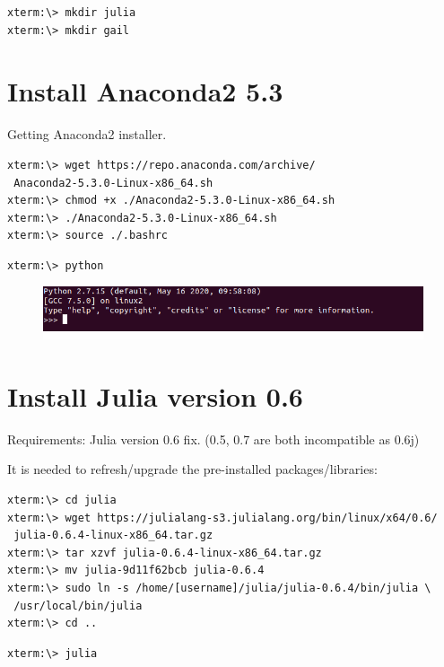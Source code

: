 \documentclass[openany,11pt]{report}%
\begin{document}
\begin{lstlisting}[style=DOS]
xterm:\> mkdir julia
xterm:\> mkdir gail
\end{lstlisting}


\section{Install Anaconda2 5.3}

Getting Anaconda2 installer.

\begin{lstlisting}[style=DOS]
xterm:\> wget https://repo.anaconda.com/archive/
 Anaconda2-5.3.0-Linux-x86_64.sh
xterm:\> chmod +x ./Anaconda2-5.3.0-Linux-x86_64.sh
xterm:\> ./Anaconda2-5.3.0-Linux-x86_64.sh
xterm:\> source ./.bashrc
\end{lstlisting}


\begin{lstlisting}[style=DOS]
xterm:\> python
\end{lstlisting}

\begin{figure}[h]
    \centering
    \includegraphics[width=\textwidth]{img/python.png}
    \label{fig: python versin}
\end{figure}

\section{Install Julia version 0.6}
Requirements: Julia version 0.6 fix.  (0.5, 0.7 are both incompatible as 0.6j)

It is needed to refresh/upgrade the pre-installed packages/libraries:
\begin{lstlisting}[style=DOS]
xterm:\> cd julia 
xterm:\> wget https://julialang-s3.julialang.org/bin/linux/x64/0.6/
 julia-0.6.4-linux-x86_64.tar.gz
xterm:\> tar xzvf julia-0.6.4-linux-x86_64.tar.gz
xterm:\> mv julia-9d11f62bcb julia-0.6.4
xterm:\> sudo ln -s /home/[username]/julia/julia-0.6.4/bin/julia \
 /usr/local/bin/julia
xterm:\> cd ..
\end{lstlisting}


\begin{lstlisting}[style=DOS]
xterm:\> julia
\end{lstlisting}
\end{document}
